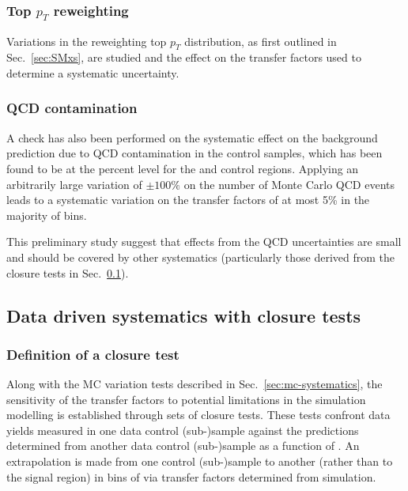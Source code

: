 \subsubsection{Top $p_T$ reweighting}

Variations in the reweighting top $p_{T}$ distribution, as first outlined in 
Sec.~\ref{sec:SMxs}, are studied and the effect on the transfer
factors used to determine a systematic uncertainty.

\subsubsection{QCD contamination}

A check has also been performed on the systematic effect on the
background prediction due to QCD contamination in the control samples,
which has been found to be at the percent level for the \mj and \gj
control regions. Applying an arbitrarily large variation of $\pm
100\%$ on the number of Monte Carlo QCD events leads to a systematic
variation on the transfer factors of at most 5\% in the majority of
bins.

This preliminary study suggest that effects from the QCD
uncertainties are small and should be covered by other systematics
(particularly those derived from the closure tests in
Sec.~\ref{sec:closure-tests}).



\subsection{Data driven systematics with closure tests}
\label{sec:closure-tests}

\subsubsection{Definition of a closure test}
\label{sec:closure-tests-desc}

Along with the MC variation tests described in Sec.~\ref{sec:mc-systematics}, 
the sensitivity of the transfer factors to potential limitations in
the simulation modelling is established through sets of closure tests.
These tests confront data yields measured in one data control (sub-)sample
against the predictions determined from another data control
(sub-)sample as a function of \scalht. An extrapolation is made
from one control (sub-)sample to another (rather than to the signal
region) in bins of \scalht via transfer factors determined from
simulation. 

